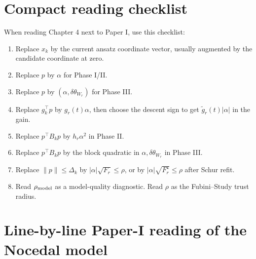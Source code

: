 \documentclass[10pt,twocolumn]{article}
\begin{document}
\section{Compact reading checklist}

When reading Chapter 4 next to Paper I, use this checklist:
\begin{enumerate}
\item Replace \(x_k\) by the current ansatz coordinate vector, usually augmented by the candidate coordinate at zero.
\item Replace \(p\) by \(\alpha\) for Phase I/II.
\item Replace \(p\) by \((\alpha,\delta\theta_{W_r})\) for Phase III.
\item Replace \(g_k^\top p\) by \(g_r(t)\alpha\), then choose the descent sign to get \(\widetilde g_r(t)|\alpha|\) in the gain.
\item Replace \(p^\top B_kp\) by \(h_r\alpha^2\) in Phase II.
\item Replace \(p^\top B_kp\) by the block quadratic in \(\alpha,\delta\theta_{W_r}\) in Phase III.
\item Replace \(\|p\|\le\Delta_k\) by \(|\alpha|\sqrt{F_r}\le\rho\), or by \(|\alpha|\sqrt{F_r^\star}\le\rho\) after Schur refit.
\item Read \(\rho_{\rm model}\) as a model-quality diagnostic. Read \(\rho\) as the Fubini--Study trust radius.
\end{enumerate}

\section{Line-by-line Paper-I reading of the Nocedal model}
\end{document}
